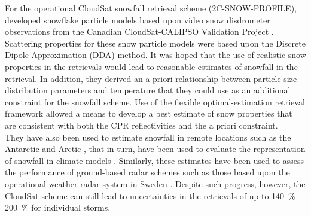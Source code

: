 For the operational CloudSat snowfall retrieval scheme (2C-SNOW-PROFILE), \citet{wood_microphysical_2015} developed snowflake particle models based upon video snow disdrometer observations from the Canadian CloudSat-CALIPSO Validation Project \citep[C3VP,][]{hudak_canadian_2006}. Scattering properties for these snow particle models were based upon the Discrete Dipole Approximation (DDA) method. It was hoped that the use of realistic snow properties in the retrievals would lead to reasonable estimates of snowfall in the retrieval. In addition, they derived an a priori relationship between particle size distribution parameters and temperature that they could use as an additional constraint for the snowfall scheme. Use of the flexible optimal-estimation retrieval framework allowed a means to develop a best estimate of snow properties that are consistent with both the CPR reflectivities and the a priori constraint. 
\\
They have also been used to estimate snowfall in remote locations such as the Antarctic and Arctic \citep{palerme_how_2014,kulie_shallow_2016}, that in turn, have been used to evaluate the representation of snowfall in climate models \citep{palerme_evaluation_2017,christensen_arctic_2016}. Similarly, these estimates have been used to assess the performance of ground-based radar schemes such as those based upon the operational weather radar system in Sweden \citep{norin_intercomparison_2015}. Despite such progress, however, the CloudSat scheme can still lead to uncertainties in the retrievals of up to \SIrange{140}{200}{\percent} \citep{wood_estimation_2011} for individual storms.
\\
